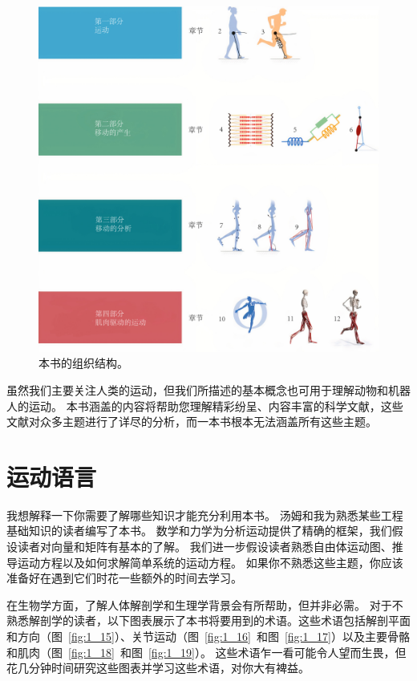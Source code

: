 \begin{figure}[!htb]
	\centering
	\includegraphics[width=1.0\linewidth]{chap1/1_14}
	\caption{本书的组织结构。 \label{fig:1_14}}
\end{figure}



虽然我们主要关注人类的运动，但我们所描述的基本概念也可用于理解动物和机器人的运动。
本书涵盖的内容将帮助您理解精彩纷呈、内容丰富的科学文献，这些文献对众多主题进行了详尽的分析，而一本书根本无法涵盖所有​​这些主题。


\section{运动语言}

我想解释一下你需要了解哪些知识才能充分利用本书。
汤姆和我为熟悉某些工程基础知识的读者编写了本书。
数学和力学为分析运动提供了精确的框架，我们假设读者对向量和矩阵有基本的了解。
我们进一步假设读者熟悉自由体运动图、推导运动方程以及如何求解简单系统的运动方程。
如果你不熟悉这些主题，你应该准备好在遇到它们时花一些额外的时间去学习。


在生物学方面，了解人体解剖学和生理学背景会有所帮助，但并非必需。
对于不熟悉解剖学的读者，以下图表展示了本书将要用到的术语。这些术语包括解剖平面和方向（图~\ref{fig:1_15}）、关节运动（图~\ref{fig:1_16}~和图~\ref{fig:1_17}）以及主要骨骼和肌肉（图~\ref{fig:1_18}~和图~\ref{fig:1_19}）。
这些术语乍一看可能令人望而生畏，但花几分钟时间研究这些图表并学习这些术语，对你大有裨益。


